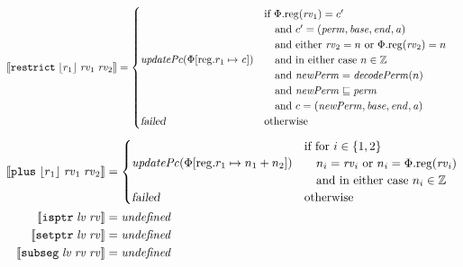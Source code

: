 \documentclass{article}
\newcommand{\update}[2]{[#1 \mapsto #2]}
\newcommand{\sem}[1]{\left\llbracket #1 \right\rrbracket}
\newcommand{\undefined}{\mathit{undefined}}
\newcommand{\var}[1]{\mathit{#1}}
\newcommand{\rv}{\var{rv}}
\newcommand{\lv}{\var{lv}}
\newcommand{\addr}{\var{a}}
\newcommand{\start}{\var{base}}
\newcommand{\addrend}{\var{end}}
\newcommand{\perm}{\var{perm}}
\newcommand{\stdcap}[1][\perm]{\left(#1,\start,\addrend,\addr \right)}
\newcommand{\plainproj}[1]{\mathrm{#1}}
\newcommand{\memreg}[1][\Phi]{#1.\plainproj{reg}}
\newcommand{\updateReg}[3][\Phi]{#1\update{\plainproj{reg}.#2}{#3}}
\newcommand{\failed}{\textsl{failed}}
\newcommand{\plainfun}[2]{
  \ifthenelse{\equal{#2}{}}
             {\mathit{#1}}
             {\mathit{#1}(#2)}
}
\newcommand{\decodePerm}{\plainfun{decodePerm}{}}
\newcommand{\stdUpdatePc}[1]{\plainfun{updatePc}{#1}}
\newcommand{\ints}{\mathbb{Z}}
\newcommand{\refreg}[1]{\lfloor #1 \rfloor}
\newcommand{\zinstr}[1]{\mathtt{#1}}
\newcommand{\twoinstr}[3]{\zinstr{#1} \; #2 \; #3}
\newcommand{\isptr}[2]{\twoinstr{isptr}{#1}{#2}}
\newcommand{\setptr}[2]{\twoinstr{setptr}{#1}{#2}}
\newcommand{\threeinstr}[4]{\zinstr{#1} \; #2 \; #3 \; #4}
\newcommand{\restrict}[3]{\threeinstr{restrict}{#1}{#2}{#3}}
\newcommand{\subseg}[3]{\threeinstr{subseg}{#1}{#2}{#3}}
\newcommand{\plus}[3]{\threeinstr{plus}{#1}{#2}{#3}}
\begin{document}
\begin{align*}
  \sem{\restrict{\refreg{r_1}}{\rv_1}{\rv_2}}           & =
                                             \begin{cases}
                                               \stdUpdatePc{\updateReg{r_1}{\var{c}}}  &
                                                 \arraycolsep=0pt
                                                 \begin{array}{l}
                                                   \text{if $\memreg(\rv_1) = c'$}\\
                                                   \quad\text{and $c' = \stdcap$}\\
                                                   \quad\text{and either $\rv_2 = n$ or $\memreg(\rv_2) = n$}\\
                                                   \quad\text{and in either case $n \in \ints$}\\
                                                   \quad\text{and $\var{newPerm} = \decodePerm(n)$}\\
                                                   \quad\text{and $\var{newPerm} \sqsubseteq \perm$}\\
                                                   \quad\text{and $c = (\var{newPerm},\start,\addrend,\addr)$}
                                                 \end{array}\\
                                               \failed                   & \text{otherwise}
                                             \end{cases} 
\end{align*}
\begin{align*}
  \sem{\plus{\refreg{r_1}}{\rv_1}{\rv_2}}               & =
                                                          \begin{cases}
                                                            \stdUpdatePc{\updateReg{r_1}{n_1+n_2}} &
                                                            \arraycolsep=0pt
                                                            \begin{array}{l}
                                                              \text{if for $i \in \{1,2\}$}\\
                                                              \quad\text{$n_i = \rv_i$ or $n_i = \memreg(\rv_i)$}\\
                                                              \quad\text{and in either case $n_i \in \ints$}
                                                            \end{array}\\
                                                            \failed & \text{otherwise}
                                                          \end{cases}\\
  \sem{\isptr{\lv}{\rv}} & = \undefined \\ 
  \sem{\setptr{\lv}{\rv}} & = \undefined \\ 
  \sem{\subseg{\lv}{\rv}{\rv}} & = \undefined 
\end{align*}
\end{document}
